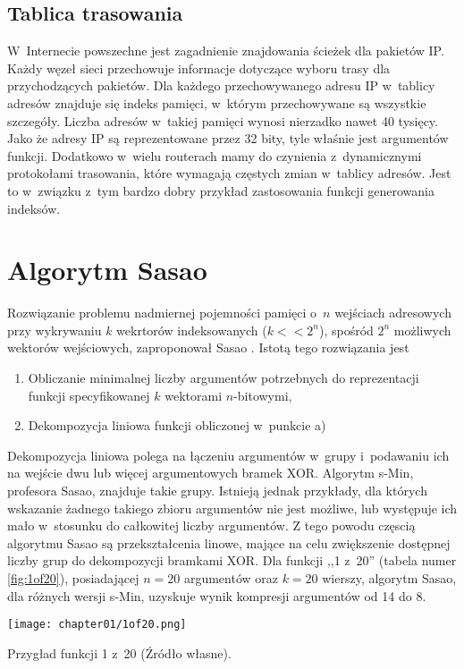 \subsection{Tablica trasowania}
W~Internecie powszechne jest zagadnienie znajdowania ścieżek dla pakietów IP.
Każdy węzeł sieci przechowuje informacje dotyczące wyboru trasy dla przychodzących pakietów.
Dla każdego przechowywanego adresu IP w~tablicy adresów znajduje się indeks pamięci, w~którym przechowywane są wszystkie szczegóły.
Liczba adresów w~takiej pamięci wynosi nierzadko nawet 40 tysięcy.
Jako że adresy IP są reprezentowane przez 32 bity, tyle właśnie jest argumentów funkcji.
Dodatkowo w~wielu routerach mamy do czynienia z~dynamicznymi protokołami trasowania, które wymagają częstych zmian w~tablicy adresów.
Jest to w~związku z~tym bardzo dobry przykład zastosowania funkcji generowania indeksów.


\section{Algorytm Sasao}
Rozwiązanie problemu nadmiernej pojemności pamięci o~$n$ wejściach adresowych przy wykrywaniu $k$ wekrtorów indeksowanych ($k<<2^n$),
spośród $2^n$ możliwych wektorów wejściowych,
zaproponował Sasao \cite{sasao-workshop, sasao-recent, sasao-s-min, sasao-synthesis}.
Istotą tego rozwiązania jest
\begin{enumerate}[label=\alph*)]
\item Obliczanie minimalnej liczby argumentów potrzebnych do reprezentacji funkcji specyfikowanej $k$ wektorami $n$-bitowymi,
\item Dekompozycja liniowa funkcji obliczonej w~punkcie a)
\end{enumerate}

Dekompozycja liniowa polega na łączeniu argumentów w~grupy i~podawaniu ich na wejście dwu lub więcej argumentowych bramek XOR.
Algorytm s-Min, profesora Sasao, znajduje takie grupy.
Istnieją jednak przykłady,
dla których wskazanie żadnego takiego zbioru argumentów nie jest możliwe,
lub występuje ich mało w~stosunku do całkowitej liczby argumentów.
Z tego powodu częscią algorytmu Sasao są przekształcenia linowe,
mające na celu zwiększenie dostępnej liczby grup do dekompozycji bramkami XOR.
Dla funkcji ,,1 z~20'' (tabela numer \ref{fig:1of20}),
posiadającej $n=20$ argumentów oraz $k=20$ wierszy,
algorytm Sasao,
dla różnych wersji s-Min,
uzyskuje wynik kompresji argumentów od 14 do 8.

\begin{table}
\centering
\texttt{[image: chapter01/1of20.png]}
\caption{Przygład funkcji 1 z~20 (Źródło własne).}
\label{fig:1of20}
\end{table}

